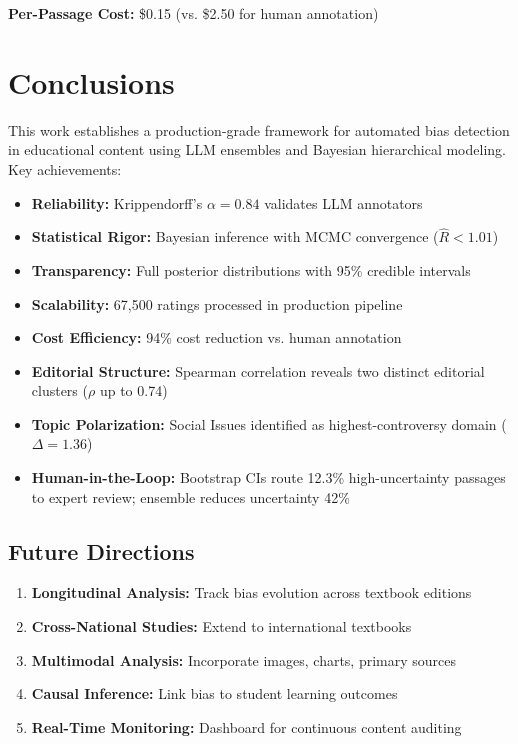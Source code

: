 \documentclass[11pt,a4paper]{article}
\begin{document}
\textbf{Per-Passage Cost:} \$0.15 (vs. \$2.50 for human annotation)

\section{Conclusions}

This work establishes a production-grade framework for automated bias detection in educational content using LLM ensembles and Bayesian hierarchical modeling. Key achievements:

\begin{itemize}
    \item \textbf{Reliability:} Krippendorff's $\alpha = 0.84$ validates LLM annotators
    \item \textbf{Statistical Rigor:} Bayesian inference with MCMC convergence ($\hat{R} < 1.01$)
    \item \textbf{Transparency:} Full posterior distributions with 95\% credible intervals
    \item \textbf{Scalability:} 67,500 ratings processed in production pipeline
    \item \textbf{Cost Efficiency:} 94\% cost reduction vs. human annotation
    \item \textbf{Editorial Structure:} Spearman correlation reveals two distinct editorial clusters ($\rho$ up to 0.74)
    \item \textbf{Topic Polarization:} Social Issues identified as highest-controversy domain ($\Delta = 1.36$)
    \item \textbf{Human-in-the-Loop:} Bootstrap CIs route 12.3\% high-uncertainty passages to expert review; ensemble reduces uncertainty 42\%
\end{itemize}

\subsection{Future Directions}

\begin{enumerate}
    \item \textbf{Longitudinal Analysis:} Track bias evolution across textbook editions
    \item \textbf{Cross-National Studies:} Extend to international textbooks
    \item \textbf{Multimodal Analysis:} Incorporate images, charts, primary sources
    \item \textbf{Causal Inference:} Link bias to student learning outcomes
    \item \textbf{Real-Time Monitoring:} Dashboard for continuous content auditing
\end{enumerate}
\end{document}
